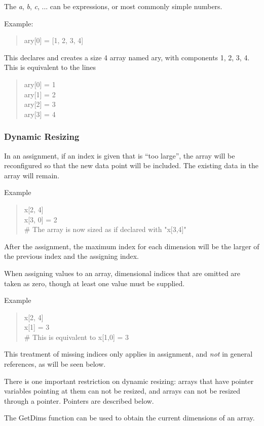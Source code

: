 The {\it a}, {\it b}, {\it c}, ...  can be expressions, or most
commonly simple numbers.

Example:    
\begin{quote}\vt
ary[0] = [1, 2, 3, 4]
\end{quote}

This declares and creates a size 4 array named {\vt ary}, with
components 1, 2, 3, 4.  This is equivalent to the lines
\begin{quote}\vt
ary[0] = 1\\
ary[1] = 2\\
ary[2] = 3\\
ary[3] = 4
\end{quote}

\subsubsection{Dynamic Resizing}

In an assignment, if an index is given that is ``too large'', the
array will be reconfigured so that the new data point will be
included.  The existing data in the array will remain.

Example
\begin{quote}\vt
x[2, 4]\\
x[3, 0] = 2\\
\# The array is now sized as if declared with "x[3,4]"
\end{quote}

After the assignment, the maximum index for each dimension will be the
larger of the previous index and the assigning index.

When assigning values to an array, dimensional indices that are
omitted are taken as zero, though at least one value must be supplied.

Example
\begin{quote}\vt
x[2, 4]\\
x[1] = 3\\
\# This is equivalent to x[1,0] = 3
\end{quote}

This treatment of missing indices only applies in assignment, and {\it
not} in general references, as will be seen below.

There is one important restriction on dynamic resizing:  arrays that
have pointer variables pointing at them can not be resized, and arrays
can not be resized through a pointer.  Pointers are described below.

The {\vt GetDims} function can be used to obtain the current
dimensions of an array.

